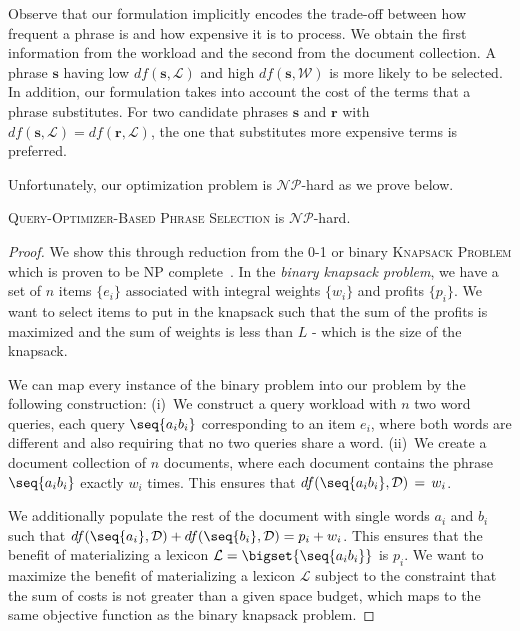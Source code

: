 Observe that our formulation implicitly encodes the trade-off between
how frequent a phrase is and how expensive it is to process. We obtain
the first information from the workload and the second from the
document collection. A phrase $\mathbf{s}$ having low
$df(\mathbf{s}, \mathcal{L})$ and high $df(\mathbf{s}, \mathcal{W})$ is
more likely to be selected. In addition, our formulation takes into
account the cost of the terms that a phrase substitutes. For two
candidate phrases $\mathbf{s}$ and $\mathbf{r}$ with
$df(\mathbf{s}, \mathcal{L}) = df(\mathbf{r}, \mathcal{L})$, the one
that substitutes more expensive terms is preferred.

Unfortunately, our optimization problem is $\mathcal{NP}$-hard as we prove below. 

\begin{theorem}{}
\label{thm:QOBS} 
 \textsc{Query-Optimizer-Based Phrase Selection} is $\mathcal{NP}$-hard.
\end{theorem}
\begin{proof}{} We show this through reduction from the
  0-1 or binary \textsc{Knapsack Problem} which is proven to be NP
  complete~\cite{Lee1988438}.  In the {\em binary knapsack problem},
  we have a set of $n$ items $\{ e_i\}$ associated with integral
  weights $\{ w_i\}$ and profits $\{ p_i \}$. We want to select items
  to put in the knapsack such that the sum of the profits is maximized
  and the sum of weights is less than $L$ - which is the size of the
  knapsack.

  We can map every instance of the binary problem into our problem by
  the following construction: (i)~We construct a query workload with
  $n$ two word queries, each query $\seq{a_i b_i}$ corresponding to an
  item $e_i$, where both words are different and also requiring that
  no two queries share a word. (ii)~We create a document collection of
  $n$ documents, where each document contains the phrase
  $\seq{a_i b_i}$ exactly $w_i$ times. This ensures that 
  $df(\seq{a_i b_i}, \mathcal{D}) \,= \, w_i$. 

  We additionally
  populate the rest of the document with single words $a_i$ and $b_i$
  such that
  $df(\seq{a_i}, \mathcal{D}) + df(\seq{b_i}, \mathcal{D}) = p_i +
  w_i$.
  This ensures that the benefit of materializing a lexicon
  $\mathcal{L} = \bigset{\seq{a_i b_i}}$ is $p_i$. We want to maximize
  the benefit of materializing a lexicon $\mathcal{L}$ subject to
  the constraint that the sum of costs is not greater than a given
  space budget, which maps to the same objective function as the
  binary knapsack problem.
\end{proof}

